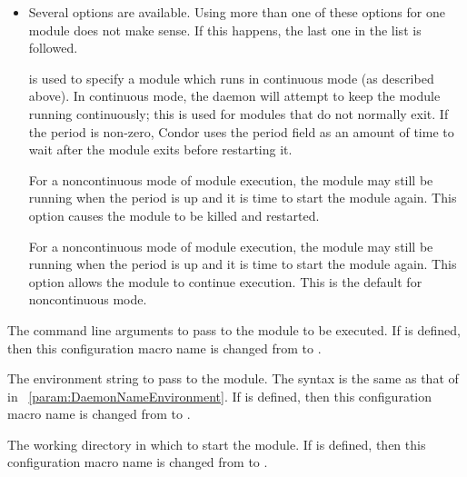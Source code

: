 \begin{description}
\begin{itemize}
   \item Several options are available. Using more than one
   of these options for one module does not make sense.  If this happens,
   the last one in the list is followed.

	 is used to specify a module which runs in continuous
	mode (as described above).
	In continuous mode, the  daemon will
	attempt to keep the module running continuously;
	this is used for modules that do not normally exit.
	If the period is non-zero, Condor uses the period field as
	an amount of time to wait after
	the module exits before restarting it.

	For a noncontinuous mode of module execution,
	the module may still be running when the period is up
	and it is time to start the module again.
	This option causes the module to be killed and restarted.

	For a noncontinuous mode of module execution,
	the module may still be running when the period is up
	and it is time to start the module again.
	This option allows the module to continue execution.
	This is the default for noncontinuous mode.
	
  \end{itemize}


\item[\Macro{STARTD\_CRON\_modulename\_ARGS}]
\label{param:StartdCronModuleArgs}
  The command line arguments to pass to the module to be executed. 
  If 
  is defined, then this configuration macro name is changed from
   to
  .


\item[\Macro{STARTD\_CRON\_modulename\_ENV}]
\label{param:StartdCronModuleEnv}
  The environment string to pass to the module.
  The syntax is the same as that of 
   in ~\ref{param:DaemonNameEnvironment}.
  If 
  is defined, then this configuration macro name is changed from
   to
  .

\item[\Macro{STARTD\_CRON\_modulename\_CWD}]
\label{param:StartdCronModuleCwd}
  The working directory in which to start the module.
  If 
  is defined, then this configuration macro name is changed from
   to
  .


\end{description}

